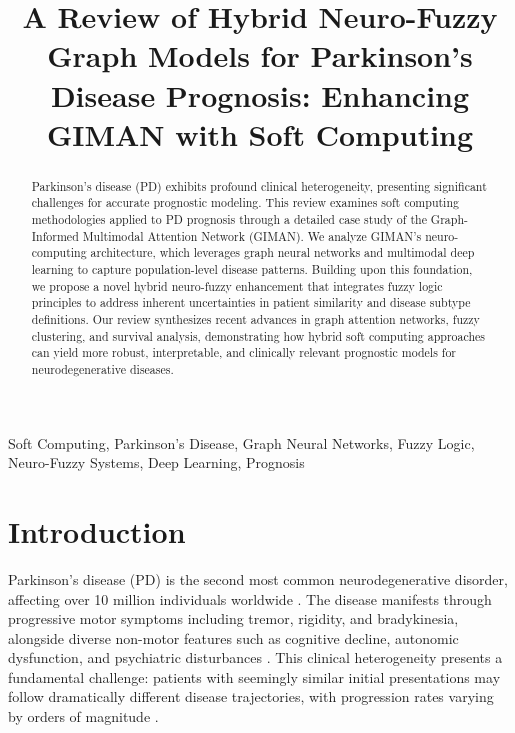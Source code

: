 \documentclass[conference]{IEEEtran}
\begin{document}
\title{A Review of Hybrid Neuro-Fuzzy Graph Models for Parkinson's Disease Prognosis: Enhancing GIMAN with Soft Computing}

\author{
}

\maketitle

\begin{abstract}
Parkinson's disease (PD) exhibits profound clinical heterogeneity, presenting significant challenges for accurate prognostic modeling. This review examines soft computing methodologies applied to PD prognosis through a detailed case study of the Graph-Informed Multimodal Attention Network (GIMAN). We analyze GIMAN's neuro-computing architecture, which leverages graph neural networks and multimodal deep learning to capture population-level disease patterns. Building upon this foundation, we propose a novel hybrid neuro-fuzzy enhancement that integrates fuzzy logic principles to address inherent uncertainties in patient similarity and disease subtype definitions. Our review synthesizes recent advances in graph attention networks, fuzzy clustering, and survival analysis, demonstrating how hybrid soft computing approaches can yield more robust, interpretable, and clinically relevant prognostic models for neurodegenerative diseases.
\end{abstract}

\begin{IEEEkeywords}
Soft Computing, Parkinson's Disease, Graph Neural Networks, Fuzzy Logic, Neuro-Fuzzy Systems, Deep Learning, Prognosis
\end{IEEEkeywords}

\section{Introduction}
Parkinson's disease (PD) is the second most common neurodegenerative disorder, affecting over 10 million individuals worldwide \cite{dorsey2018parkinsons}. The disease manifests through progressive motor symptoms including tremor, rigidity, and bradykinesia, alongside diverse non-motor features such as cognitive decline, autonomic dysfunction, and psychiatric disturbances \cite{schapira2017nonmotor}. This clinical heterogeneity presents a fundamental challenge: patients with seemingly similar initial presentations may follow dramatically different disease trajectories, with progression rates varying by orders of magnitude \cite{fereshtehnejad2017clinical}.
\end{document}
